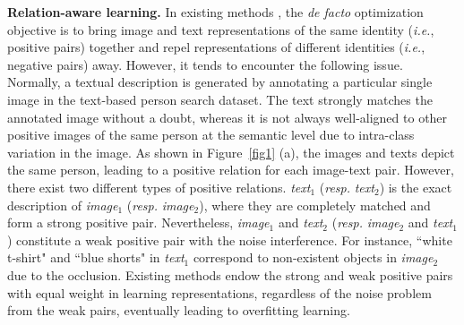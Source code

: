 \documentclass{article}
\begin{document}
\textbf{Relation-aware learning.}
In existing methods \cite{han2021textreid,li2022learning}, the \emph{de facto} optimization objective is to bring image and text representations of the same identity (\emph{i.e.}, positive pairs) together and repel representations of different identities (\emph{i.e.}, negative pairs) away.
However, it tends to encounter the following issue.
Normally, a textual description is generated by annotating a particular single image in the text-based person search dataset. The text strongly matches the annotated image without a doubt, whereas it is not always well-aligned to other positive images of the same person at the semantic level due to intra-class variation in the image.
As shown in Figure~\ref{fig1} (a), the images and texts depict the same person, leading to a positive relation for each image-text pair.
However, there exist two different types of positive relations.
\textit{text$_1$} (\emph{resp.} \textit{text$_2$}) is the exact description of \textit{image$_1$} (\emph{resp.} \textit{image$_2$}), where they are completely matched and form a strong positive pair.
Nevertheless, \textit{image$_1$} and \textit{text$_2$} (\emph{resp.} \textit{image$_2$} and \textit{text$_1$}) constitute a weak positive pair with the noise interference.
For instance, ``white t-shirt" and ``blue shorts" in \textit{text$_1$} correspond to non-existent objects in \textit{image$_2$} due to the occlusion.
Existing methods endow the strong and weak positive pairs with equal weight in learning representations, regardless of the noise problem from the weak pairs, eventually leading to overfitting learning.

\end{document}
